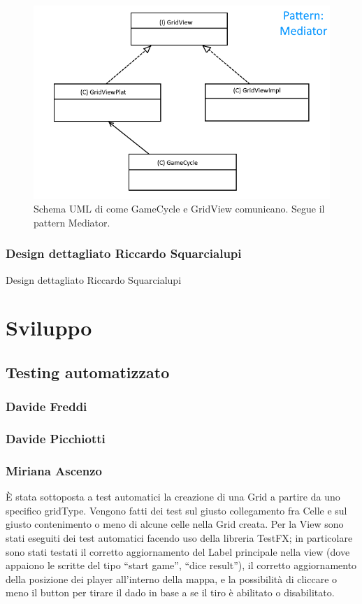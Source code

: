 \documentclass[a4paper,12pt]{report}
\begin{document}
\begin{figure}[!t]
\centering{}
\includegraphics[width=\textwidth]{images/gridImages/gridMediator.png}
\caption{Schema UML di come GameCycle e GridView comunicano. Segue il pattern Mediator.}
\label{img:gridmediator}
\end{figure}

\subsection{Design dettagliato Riccardo Squarcialupi}
Design dettagliato Riccardo Squarcialupi

\chapter{Sviluppo}
\section{Testing automatizzato}

\subsection{Davide Freddi}
\subsection{Davide Picchiotti}
\subsection{Miriana Ascenzo}

È stata sottoposta a test automatici la creazione di una Grid a partire da uno specifico gridType.
%
Vengono fatti dei test sul giusto collegamento fra Celle e sul giusto contenimento o meno di alcune celle nella Grid creata.
%
Per la View sono stati eseguiti dei test automatici facendo uso della libreria TestFX; in particolare sono stati testati il corretto aggiornamento del Label principale nella view (dove appaiono le scritte del tipo “start game”, “dice result”),
%
il corretto aggiornamento della posizione dei player all'interno della mappa, e la possibilità di cliccare o meno il button per tirare il dado in base a se il tiro è abilitato o disabilitato.
\end{document}
